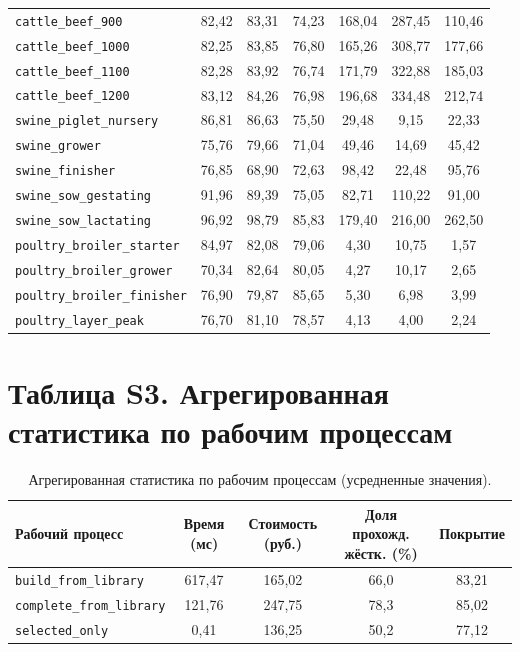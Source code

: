 \documentclass[11pt]{article}
\begin{document}
\begin{longtable}{lcccccc}
\texttt{cattle\_beef\_900} & 82{,}42 & 83{,}31 & 74{,}23 & 168{,}04 & 287{,}45 & 110{,}46 \\
\texttt{cattle\_beef\_1000} & 82{,}25 & 83{,}85 & 76{,}80 & 165{,}26 & 308{,}77 & 177{,}66 \\
\texttt{cattle\_beef\_1100} & 82{,}28 & 83{,}92 & 76{,}74 & 171{,}79 & 322{,}88 & 185{,}03 \\
\texttt{cattle\_beef\_1200} & 83{,}12 & 84{,}26 & 76{,}98 & 196{,}68 & 334{,}48 & 212{,}74 \\
\texttt{swine\_piglet\_nursery} & 86{,}81 & 86{,}63 & 75{,}50 & 29{,}48 & 9{,}15 & 22{,}33 \\
\texttt{swine\_grower} & 75{,}76 & 79{,}66 & 71{,}04 & 49{,}46 & 14{,}69 & 45{,}42 \\
\texttt{swine\_finisher} & 76{,}85 & 68{,}90 & 72{,}63 & 98{,}42 & 22{,}48 & 95{,}76 \\
\texttt{swine\_sow\_gestating} & 91{,}96 & 89{,}39 & 75{,}05 & 82{,}71 & 110{,}22 & 91{,}00 \\
\texttt{swine\_sow\_lactating} & 96{,}92 & 98{,}79 & 85{,}83 & 179{,}40 & 216{,}00 & 262{,}50 \\
\texttt{poultry\_broiler\_starter} & 84{,}97 & 82{,}08 & 79{,}06 & 4{,}30 & 10{,}75 & 1{,}57 \\
\texttt{poultry\_broiler\_grower} & 70{,}34 & 82{,}64 & 80{,}05 & 4{,}27 & 10{,}17 & 2{,}65 \\
\texttt{poultry\_broiler\_finisher} & 76{,}90 & 79{,}87 & 85{,}65 & 5{,}30 & 6{,}98 & 3{,}99 \\
\texttt{poultry\_layer\_peak} & 76{,}70 & 81{,}10 & 78{,}57 & 4{,}13 & 4{,}00 & 2{,}24 \\
\end{longtable}

\section*{Таблица S3. Агрегированная статистика по рабочим процессам}
\begin{table}[H]
\centering
\caption{Агрегированная статистика по рабочим процессам (усредненные значения).}\label{tab:s3_wf}
\begin{tabular}{lcccc}
\toprule
\textbf{Рабочий процесс} & \textbf{Время (мс)} & \textbf{Стоимость (руб.)} & \textbf{Доля прохожд. жёстк. (\%)} & \textbf{Покрытие} \\
\midrule
\texttt{build\_from\_library} & 617{,}47 & 165{,}02 & 66{,}0 & 83{,}21 \\
\texttt{complete\_from\_library} & 121{,}76 & 247{,}75 & 78{,}3 & 85{,}02 \\
\texttt{selected\_only} & 0{,}41 & 136{,}25 & 50{,}2 & 77{,}12 \\
\bottomrule
\end{tabular}
\end{table}
\end{document}

